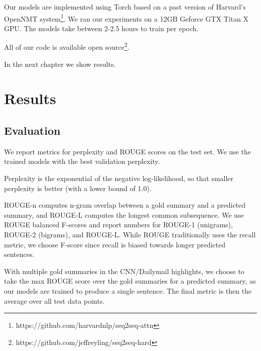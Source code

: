 \documentclass[12pt]{report}
\begin{document}



Our models are implemented using Torch \citep{Torch} based on a past version of Harvard's OpenNMT system\footnote{https://github.com/harvardnlp/seq2seq-attn}. We ran our experiments on a 12GB Geforce GTX Titan X GPU.
The models take between 2-2.5 hours to train per epoch.

All of our code is available open source\footnote{https://github.com/jeffreyling/seq2seq-hard}.

In the next chapter we show results.

\chapter{Results}
\label{chap:results}

\section{Evaluation}

We report metrics for perplexity and ROUGE scores \citep{lin2004rouge} on the test set. We use the trained models with the best validation perplexity.

Perplexity is the exponential of the negative log-likelihood, so that smaller perplexity is better (with a lower bound of 1.0).

ROUGE-n computes n-gram overlap between a gold summary and a predicted summary, and ROUGE-L computes the longest common subsequence.
We use ROUGE balanced F-scores and report numbers for ROUGE-1 (unigrams), ROUGE-2 (bigrams), and ROUGE-L. While ROUGE traditionally uses the recall metric, we choose F-score since recall is biased towards longer predicted sentences.

With multiple gold summaries in the CNN/Dailymail highlights, we choose to take the max ROUGE score over the gold summaries for a predicted summary, as our models are trained to produce a single sentence. The final metric is then the average over all test data points. %
\end{document}
